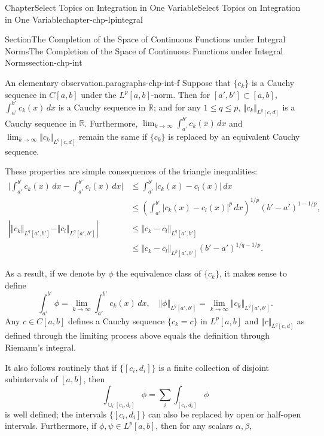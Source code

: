 \documentclass[oneside,10pt,]{book}
\numberwithin{equation}{section}
\newcommand{\bbR}{\mathbb{R}}
\newcommand{\amp}{&}
\begin{document}
\begin{chapterptx}{Chapter}{Select Topics on Integration in One Variable}{}{Select Topics on Integration in One Variable}{}{}{chapter-chp-lpintegral}
\begin{sectionptx}{Section}{The Completion of the Space of Continuous Functions under Integral Norms}{}{The Completion of the Space of Continuous Functions under Integral Norms}{}{}{section-chp-int}
\begin{enumerate}[label=\alph*.]
\end{enumerate}
%
\begin{paragraphs}{An elementary observation.}{paragraphs-chp-int-f}%
 Suppose that \(\{ c_{k}\}\) is a Cauchy sequence in \(C[a, b]\) under the \(L^{p}[a,  b]\)-norm. Then for \([a', b']\subset [a, b]\), \(\int_{a'}^{b'} c_{k}(x)\, dx\) is a Cauchy sequence in \(\bbR\); and for any \(1\le q \le p\), \(\Vert c_{k} \Vert_{L^{q}[c,d]}\)  is a Cauchy sequence in \(\bbR\). Furthermore, \(\lim_{k\to\infty} \int_{a'}^{b'} c_{k}(x)\, dx\) and \(\lim_{k\to\infty}\Vert c_{k} \Vert_{L^{q}[c,d]}\) remain the same if \(\{ c_{k}\}\) is replaced by an equivalent Cauchy sequence.\end{paragraphs}%
\par
These properties are simple consequences of the triangle inequalities:%
\begin{align*}
\vert \int_{a'}^{b'} c_{k}(x)\, dx - \int_{a'}^{b'} c_{l}(x)\, dx\vert \amp\le \int_{a'}^{b'} \vert c_{k}(x)-c_{l}(x)\vert \, dx\\
\amp\le \left(\int_{a'}^{b'} \vert c_{k}(x)-c_{l}(x)\vert^{p} \, dx\right)^{1/p}(b'-a')^{1-1/p},\\
\left| \Vert c_{k} \Vert_{L^{q}[a', b']} -\Vert c_{l} \Vert_{L^{q}[a', b']}\right| \amp\le \Vert c_{k} -c_{l}\Vert_{L^{q}[a', b']}\\
\amp 	\le  \Vert c_{k} -c_{l}\Vert_{L^{p}[a', b']}(b'-a')^{1/q-1/p}.
\end{align*}
%
\par
As a result, if we denote by \(\phi\) the equivalence class of \(\{ c_{k}\}\), it makes sense to define%
\begin{equation*}
\int_{a'}^{b'} \phi = \lim_{k\to\infty} \int_{a'}^{b'} c_{k}(x)\, dx, \quad
\Vert \phi \Vert_{L^{q}[a', b']}= \lim_{k\to\infty}\Vert c_{k} \Vert_{L^{q}[a', b']}.
\end{equation*}
Any \(c\in C[a, b]\) defines a Cauchy sequence \(\{c_{k} = c\}\) in \(L^{p}[a, b]\) and \(\Vert c \Vert_{L^{q}[c,d]}\) as defined through the limiting process above equals the definition through Riemann's integral.%
\par
It also follows routinely that if \(\{[c_{i}, d_{i}]\}\) is a finite collection of disjoint subintervals of \([a, b]\), then%
\begin{equation*}
\int_{\cup_{i} [c_{i}, d_{i}] }\phi = \sum_{i}\int_{[c_{i},d_{i}]} \phi 
\end{equation*}
is well defined; the intervals \(\{[c_{i}, d_{i}]\}\) can also be replaced by open or half-open intervals. Furthermore, if \(\phi, \psi \in L^{p}[a, b]\), then for any scalars \(\alpha, \beta\),%

\end{sectionptx}
\end{chapterptx}
\end{document}
